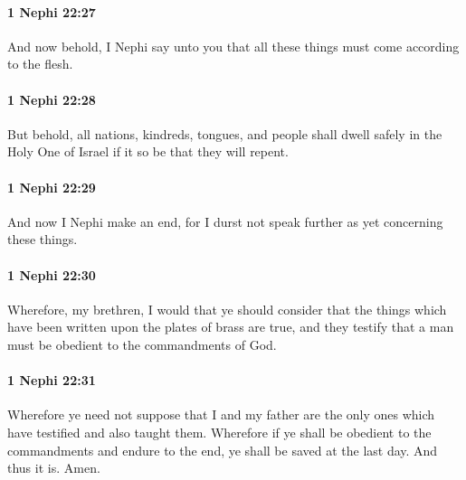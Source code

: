 		\paragraph{1 Nephi 22:27} %
			\label{1 Nephi-22-27}

			And now behold, I Nephi say unto you
			that all these things must come according to the flesh.

		\paragraph{1 Nephi 22:28} %
			\label{1 Nephi-22-28}

			But behold, all nations, kindreds, tongues, and people
			shall dwell safely in the Holy One of Israel
			if it so be that they will repent.

		\paragraph{1 Nephi 22:29} %
			\label{1 Nephi-22-29}

			And now I Nephi make an end,
			for I durst not speak further as yet concerning these things.

		\paragraph{1 Nephi 22:30} %
			\label{1 Nephi-22-30}

			Wherefore, my brethren, I would that ye should consider
			that the things which have been written upon the plates of brass are true,
			and they testify that a man must be obedient to the commandments of God.

		\paragraph{1 Nephi 22:31} %
			\label{1 Nephi-22-31}

			Wherefore ye need not suppose that I and my father are the only ones
			which have testified and also taught them.
			Wherefore if ye shall be obedient to the commandments and endure to the end,
			ye shall be saved at the last day.
			And thus it is.
			Amen.